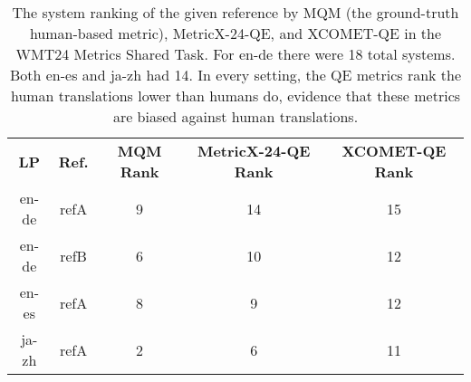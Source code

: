 \begin{table}[t]
    \centering
    \begin{adjustbox}{width=\columnwidth}
    \begin{tabular}{ccccc}
        \toprule
        \multirow{2}{*}{\bf LP} & \multirow{2}{*}{\bf \centering Ref.} & \multirow{2}{1cm}{\bf \centering MQM Rank} & \multirow{2}{3cm}{\bf \centering MetricX-24-QE Rank} & \multirow{2}{3cm}{\bf \centering XCOMET-QE Rank} \\
        & & & & \\
        \midrule
        en-de & refA & 9 & 14 & 15 \\
        en-de & refB & 6 & 10 & 12 \\
        en-es & refA & 8 & 9 & 12 \\
        ja-zh & refA & 2 & 6 & 11 \\
        \bottomrule
    \end{tabular}
    \end{adjustbox}
    \caption{The system ranking of the given reference by MQM (the ground-truth human-based metric), MetricX-24-QE, and XCOMET-QE in the WMT24 Metrics Shared Task.
    For en-de there were 18 total systems.
    Both en-es and ja-zh had 14.
    In every setting, the QE metrics rank the human translations lower than humans do, evidence that these metrics are biased against human translations.
    }
    \label{tab:metric_bias}
\end{table}